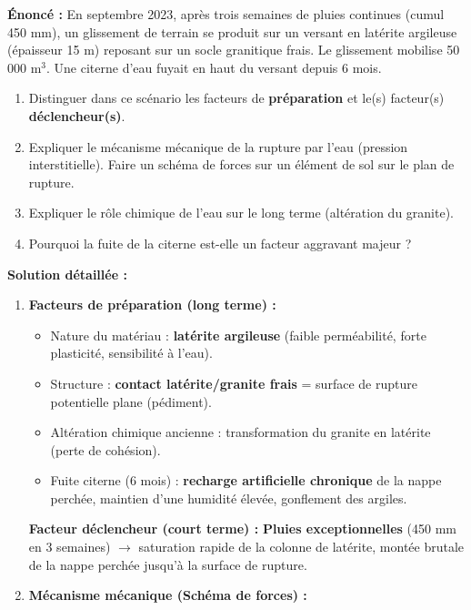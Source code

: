 \documentclass[11pt]{article}
\begin{document}
\begin{exoresolu}
    \textbf{Énoncé :} En septembre 2023, après trois semaines de pluies continues (cumul 450 mm), un glissement de terrain se produit sur un versant en latérite argileuse (épaisseur 15 m) reposant sur un socle granitique frais. Le glissement mobilise 50 000 m$^3$. Une citerne d'eau fuyait en haut du versant depuis 6 mois.
    \begin{enumerate}
        \item Distinguer dans ce scénario les facteurs de \textbf{préparation} et le(s) facteur(s) \textbf{déclencheur(s)}.
        \item Expliquer le mécanisme mécanique de la rupture par l'eau (pression interstitielle). Faire un schéma de forces sur un élément de sol sur le plan de rupture.
        \item Expliquer le rôle chimique de l'eau sur le long terme (altération du granite).
        \item Pourquoi la fuite de la citerne est-elle un facteur aggravant majeur ?
    \end{enumerate}
    \tcblower
    \textbf{Solution détaillée :}
    \begin{enumerate}
        \item \textbf{Facteurs de préparation (long terme) :}
            \begin{itemize}
                \item Nature du matériau : \textbf{latérite argileuse} (faible perméabilité, forte plasticité, sensibilité à l'eau).
                \item Structure : \textbf{contact latérite/granite frais} = surface de rupture potentielle plane (pédiment).
                \item Altération chimique ancienne : transformation du granite en latérite (perte de cohésion).
                \item Fuite citerne (6 mois) : \textbf{recharge artificielle chronique} de la nappe perchée, maintien d'une humidité élevée, gonflement des argiles.
            \end{itemize}
            \textbf{Facteur déclencheur (court terme) :} \textbf{Pluies exceptionnelles} (450 mm en 3 semaines) $\rightarrow$ saturation rapide de la colonne de latérite, montée brutale de la nappe perchée jusqu'à la surface de rupture.
        \item \textbf{Mécanisme mécanique (Schéma de forces) :}
            \begin{popfigure}

\end{popfigure}
\end{enumerate}
\end{exoresolu}
\end{document}
